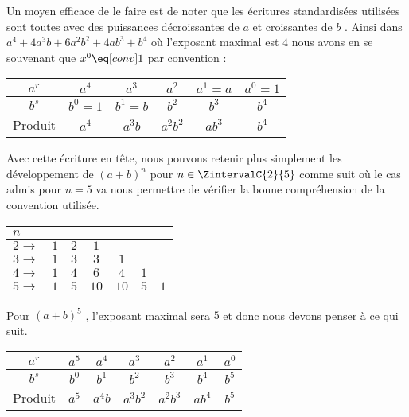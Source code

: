 Un moyen efficace de le faire est de noter que les écritures standardisées utilisées sont toutes avec des puissances décroissantes de $a$ et croissantes de $b$ .
Ainsi dans $a^4 + 4 a^3 b + 6 a^2 b^2 + 4 a b^3 + b^4$ où l'exposant maximal est $4$ nous avons en se souvenant que $x^0 \eq[conv] 1$ par convention :

\medskip
\begin{center}
\begin{tabular}{c*{5}{|c}}
	$a^r$
		& $a^4$      &  $a^3$      &  $a^2$      &  $a^1 = a$  &  $a^0 = 1$
	\\ \hline
	$b^s$ 
		& $b^0 = 1$  &  $b^1 = b$  &  $b^2$      &  $b^3$      &  $b^4$
	\\ \hline
	Produit 
		& $a^4$      &  $a^3 b$    &  $a^2 b^2$  &  $a b^3$    &  $b^4$
\end{tabular}
\end{center}

\medskip
Avec cette écriture en tête, nous pouvons retenir plus simplement les développement de $(a + b)^n$ pour $n \in \ZintervalC{2}{5}$ comme suit où le cas admis pour $n = 5$ va nous permettre de vérifier la bonne compréhension de la convention utilisée.

\medskip
\begin{center}
\begin{tabular}{|l*{6}{|c}|}
	\hline
	$n$
		&      &       &        &        &       &
	\\ \hline
	$2 \rightarrow$ 
		& $1$  &  $2$  &  $1$   &        &       &
	\\ \hline
	$3 \rightarrow$ 
		& $1$  &  $3$  &  $3$   &  $1$   &       &
	\\ \hline
	$4 \rightarrow$ 
		& $1$  &  $4$  &  $6$   &  $4$   &  $1$  &
	\\ \hline
	$5 \rightarrow$ 
		& $1$  &  $5$  &  $10$  &  $10$  &  $5$  &  $1$
	\\ \hline
\end{tabular}
\end{center}

\medskip
Pour $(a + b)^5$ , l'exposant maximal sera $5$ et donc nous devons penser à ce qui suit.

\medskip
\begin{center}
\begin{tabular}{c*{6}{|c}}
	$a^r$
		& $a^5$  &  $a^4$    &  $a^3$      &  $a^2$      &  $a^1$    &  $a^0$
	\\ \hline
	$b^s$ 
		& $b^0$  &  $b^1$    &  $b^2$      &  $b^3$      &  $b^4$    &  $b^5$
	\\ \hline
	Produit 
		& $a^5$  &  $a^4 b$  &  $a^3 b^2$  &  $a^2 b^3$  &  $a b^4$  &  $b^5$
\end{tabular}
\end{center}

